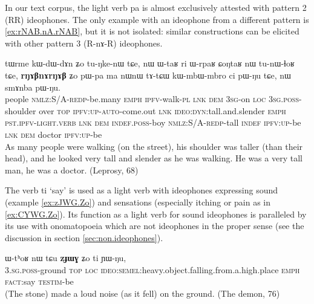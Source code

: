 \documentclass[oldfontcommands,oneside,a4paper,11pt]{article}
\newcommand{\ipa}[1]{{\phon \mbox{#1}}} %
\begin{document}
In our text corpus, the light verb \ipa{pa} is almost exclusively attested with pattern 2 (RR) ideophones. The only example with an ideophone from a different pattern is \ref{ex:rNAB.nA.rNAB}, but it is not isolated: similar constructions  can be elicited with other pattern 3 (R\ipa{-nɤ-}R) ideophones.
\begin{exe}
\ex \label{ex:rNAB.nA.rNAB}
\gll
\ipa{tɯrme}  	\ipa{kɯ-dɯ-dɤn}  	\ipa{ʑo}  	\ipa{tu-ŋke-nɯ}  	\ipa{tɕe,}  	\ipa{nɯ}  	\ipa{ɯ-taʁ}  	\ipa{ri}  	\ipa{ɯ-rpaʁ}  	\ipa{ɕoŋtaʁ}  	\ipa{nɯ}  	\ipa{tu-nɯ-ɬoʁ}  	\ipa{tɕe,}  	\ipa{\textbf{rŋɤβnɤrŋɤβ}}  	\ipa{ʑo}  	\ipa{pɯ-pa}  	\ipa{ma}  	\ipa{nɯnɯ}  	\ipa{tɤ-tɕɯ}  	\ipa{kɯ-mbɯ-mbro}  	\ipa{ci}  	\ipa{pɯ-ŋu}  	\ipa{tɕe,}  	\ipa{nɯ}  	\ipa{smɤnba}  	\ipa{pɯ-ŋu.}  \\
people \textsc{nmlz:S/A-redp}-be.many \textsc{emph} \textsc{ipfv}-walk-\textsc{pl} \textsc{lnk} \textsc{dem} \textsc{3sg}-on \textsc{loc} \textsc{3sg.poss}-shoulder over \textsc{top} \textsc{ipfv:up-auto}-come.out \textsc{lnk} \textsc{ideo:dyn}:tall.and.slender \textsc{emph} \textsc{pst.ipfv-light.verb} \textsc{lnk} \textsc{dem} \textsc{indef.poss}-boy \textsc{nmlz:S/A-redp}-tall \textsc{indef} \textsc{ipfv:up}-be \textsc{lnk} \textsc{dem} doctor \textsc{ipfv:up}-be \\
\glt As many people were walking (on the street), his shoulder was taller (than their  head), and he looked very tall and slender as he was walking. He was a very tall man, he was a doctor.
 (Leprosy, 68)
\end{exe}

The verb \ipa{ti}   `say' is used as a light verb with  ideophones expressing sound (example \ref{ex:zJWG.Zo}) and sensations (especially itching or pain as in \ref{ex:CYWG.Zo}). Its function as a light verb for sound ideophones is paralleled by its use with onomatopoeia which are not ideophones in the proper sense (see the discussion in  section \ref{sec:non.ideophones}).

\begin{exe}
\ex \label{ex:zJWG.Zo}
\gll
 \ipa{ɯ-tʰoʁ} 	\ipa{nɯ} 	\ipa{tɕu} 	\ipa{\textbf{zɟɯɣ}} 	\ipa{ʑo} 	\ipa{ti} 	\ipa{ɲɯ-ŋu,} \\
\textsc{3.sg.poss}-ground \textsc{top} \textsc{loc} \textsc{ideo:semel}:heavy.object.falling.from.a.high.place \textsc{emph} \textsc{fact}:say \textsc{testim}-be \\
\glt (The stone) made a loud noise (as it fell) on the ground. (The demon, 76)
\end{exe}
 
\end{document}
